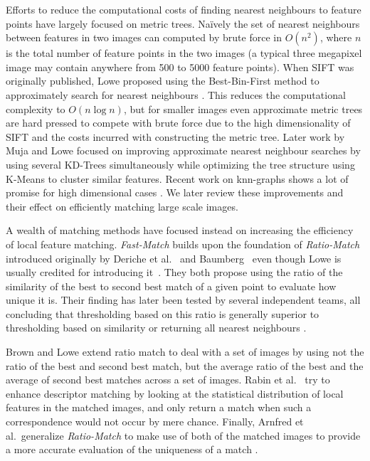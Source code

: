 \documentclass[runningheads]{llncs}
\begin{document}
Efforts to reduce the computational costs of finding nearest neighbours
to feature points have largely focused on metric trees. Na\"ively the
set of nearest neighbours between features in two images can computed by
brute force in $O(n^2)$, where $n$ is the total number of feature points
in the two images (a typical three megapixel image may contain anywhere
from 500 to 5000 feature points). When SIFT was originally published,
Lowe proposed using the Best-Bin-First method to approximately search
for nearest neighbours \cite{beis1997shape,lowe1999object}. This reduces
the computational complexity to $O(n\log n)$, but for smaller images
even approximate metric trees are hard pressed to compete with brute
force due to the high dimensionality of SIFT and the costs
incurred with constructing the metric tree. Later work by Muja and Lowe \cite{muja2009fast} focused on improving approximate nearest neighbour searches by using several KD-Trees simultaneously while optimizing the tree structure using K-Means to cluster similar features. Recent work on knn-graphs shows a lot of promise for high dimensional cases \cite{dong2011efficient}. We later review these improvements and their effect on efficiently matching large scale images.

A wealth of matching methods have focused instead on increasing the efficiency of local feature matching. \emph{Fast-Match} builds upon the foundation of \emph{Ratio-Match} introduced originally by Deriche et al.~\cite{deriche1994robust} and Baumberg~\cite{baumberg2000reliable} even though Lowe is usually credited for introducing it~\cite{lowe2004sift}. They both propose using the ratio of the similarity of the best to second best match of a given point to evaluate how unique it is. Their finding has later been tested by several independent teams, all concluding that thresholding based on this ratio is generally superior to thresholding based on similarity or returning all nearest neighbours \cite{lowe2004sift,mikolajczyk2005performance,moreels2007evaluation,rabin2009statistical}.

Brown and Lowe \cite{brown2005multi} extend ratio match to deal with a set of images by using not the ratio of the best and second best match, but the average ratio of the best and the average of second best matches across a set of images.  Rabin et al.\ \cite{rabin2009statistical} try to enhance descriptor matching by looking at the statistical distribution of local features in the matched images, and only return a match when such a correspondence would not occur by mere chance. Finally, Arnfred et al.\ generalize \emph{Ratio-Match} to make use of both of the matched images to provide a more accurate evaluation of the uniqueness of a match \cite{arnfred2013mirror}.
\end{document}
